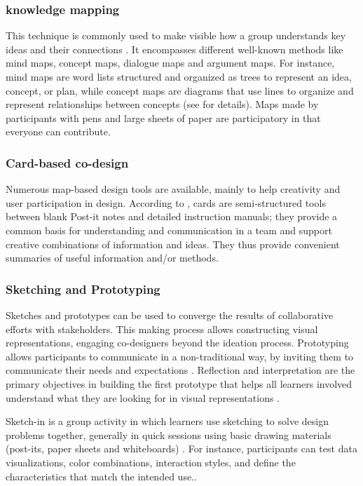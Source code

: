 \documentclass[preprint,12pt]{elsarticle}
\begin{document}
\subsubsection{knowledge mapping}
This technique is commonly used to make visible how a group understands key ideas and their connections \cite{prieto2018co}. It encompasses different well-known methods like  mind maps, concept
maps, dialogue maps and argument maps. For instance, mind maps are word lists structured and organized as trees to represent an idea, concept, or plan, while concept maps are diagrams that use lines to organize and represent relationships between concepts \cite{carrillo2017dashboard} (see \cite{okada2008knowledge} for details). Maps made by participants with pens and large sheets of paper are participatory in that everyone can contribute.

\subsubsection{Card-based co-design}
Numerous map-based design tools are available, mainly to help creativity and user participation in design. According to \citet{roy2019card}, cards are semi-structured tools between blank Post-it notes and detailed instruction manuals; they provide a common basis for understanding and communication in a team and support creative combinations of information and ideas. They thus  provide convenient summaries of useful information and/or methods.

\subsubsection{Sketching and Prototyping}
Sketches and prototypes can be used to converge the results of collaborative efforts with stakeholders. This making process allows constructing visual representations, engaging co-designers beyond the ideation process. Prototyping allows participants to communicate in a non-traditional way, by inviting them to communicate their needs and expectations \cite{gaver1999design}.
Reflection and interpretation are the primary objectives in building the first prototype that helps all learners involved understand what they are looking for in visual representations \cite{luckin2013handbook}.

Sketch-in is a group activity in which learners use sketching to solve design problems together, generally in quick sessions using basic drawing materials (post-its, paper sheets and whiteboards) \cite{prieto2018co}. For instance, participants can test data visualizations, color combinations, interaction styles, and define the characteristics that match the intended use..
\end{document}
